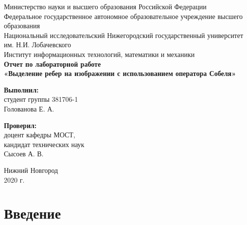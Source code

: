 \documentclass[14pt, a4paper]{extreport}
\begin{document}
\begin{titlepage}

\begin{center}
Министерство науки и высшего образования Российской Федерации\\ 
\vspace{5mm}
Федеральное государственное автономное образовательное учреждение высшего образования\\
Национальный исследовательский Нижегородский государственный университет им. Н.И. Лобачевского\\
\vspace{1cm}
Институт информационных технологий, математики и механики\\
\vspace{5cm}
\textbf{\large Отчет по лабораторной работе} \\
\vspace{8mm}
\textbf{\Large «Выделение ребер на изображении с использованием оператора Собеля»} \\

\end{center}

\newlength{\ML}

\begin{flushright}
\textbf{ Выполнил:}\\
студент группы 381706-1\\
Голованова Е. А.\\
\end{flushright}
\begin{flushright}
\textbf{Проверил:}\\
доцент кафедры МОСТ,\\
кандидат технических наук\\
Сысоев А. В. \\
\end{flushright}
\vfill 
\begin{center}
 Нижний Новгород\\
 2020 г.
\end{center}
\end{titlepage}
\setcounter{page}{2}
\tableofcontents
\newpage 

\section*{Введение}
\end{document}
